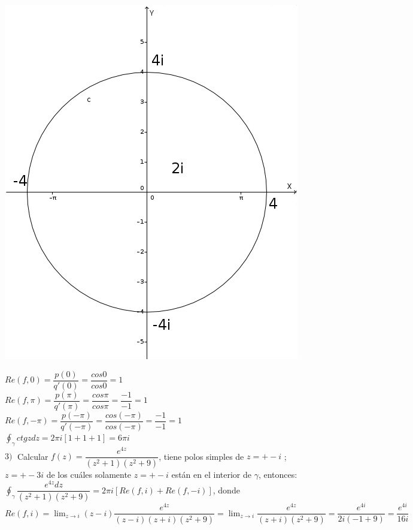 \documentclass[10pt,a4paper]{article}
\begin{document}
\begin{center}
\includegraphics[scale=0.3]{2.png}
\end{center}
$Re(f,0) = \dfrac{p(0)}{q'(0)} = \dfrac{cos 0}{cos 0} = 1$ \\
$Re(f,\pi) = \dfrac{p(\pi)}{q'(\pi)} = \dfrac{cos \pi}{cos \pi} = \dfrac{-1}{-1} = 1$ \\
$Re(f,-\pi) = \dfrac{p(-\pi)}{q'(-\pi)} = \dfrac{cos (-\pi)}{cos (-\pi)} = \dfrac{-1}{-1} = 1$ \\ 
$\displaystyle{\oint_{\gamma} ctg zdz = 2 \pi i [1 +1+1]= 6 \pi i}$\\
$3) \; $ Calcular $\displaystyle{f(z) = \dfrac{e^{4z}}{(z^2+1)(z^2+9)}}$, tiene polos simples de $z = +- i$ ; $z = +- 3i$ de los cuáles solamente $z = +- i$  están en el interior de $\gamma$, entonces: \\
$\displaystyle{\oint_{\gamma} \dfrac{e^{4z} dz}{(z^2+1)(z^2+9)} = 2 \pi i [Re(f,i) + Re(f,-i)]}$, donde \\
$\displaystyle{Re(f,i) = \lim_{z \to i} (z-i) \dfrac{e^{4z}}{(z-i)(z+i)(z^2+9)} = \lim_{z \to i} \dfrac{e^{4z}}{(z+i)(z^2+9)} = \dfrac{e^{4i}}{2i(-1+9)} = \dfrac{e^{4i}}{16i}}$\\
\end{document}
